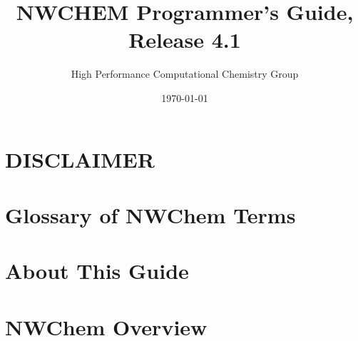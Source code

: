 \setlength{\parskip}{6pt}

\newcommand{\TRUE}{\verb+.true.+}
\newcommand{\FALSE}{\verb+.false.+}
\newcommand{\nwchemversion}{4.1}
\newcommand{\nwchemyear}{2002}



\title{\bf\Large NWCHEM Programmer's Guide, Release \nwchemversion}
\author{High Performance Computational Chemistry Group}
\date{\today}
\maketitle

\chapter*{\center DISCLAIMER}


\chapter*{Glossary of NWChem Terms}


\chapter*{About This Guide}


\clearpage

\tableofcontents

\clearpage

\chapter{NWChem Overview}



